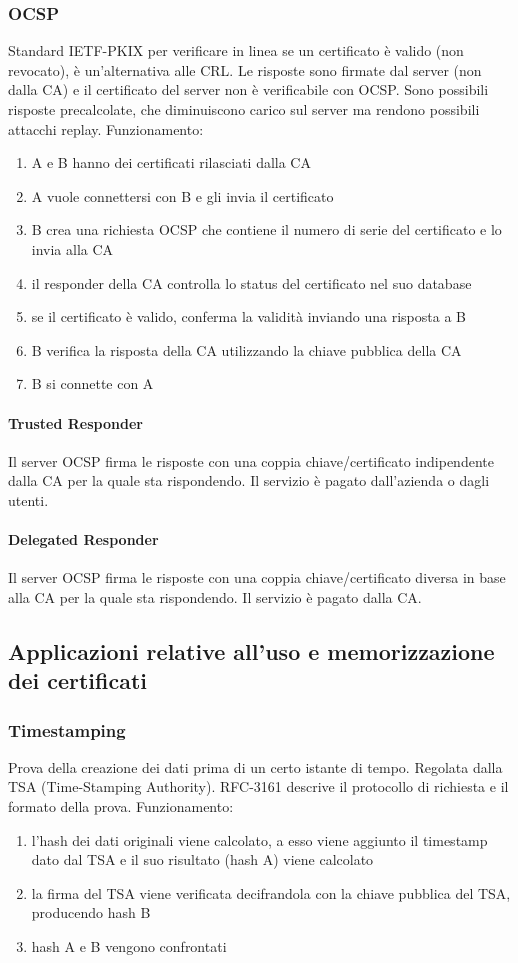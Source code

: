 \documentclass[11pt]{article}
\begin{document}
\subsubsection{OCSP}
Standard IETF-PKIX per verificare in linea se un certificato è valido (non revocato), è un'alternativa alle CRL. 
Le risposte sono firmate dal server (non dalla CA) e il certificato del server non è verificabile con OCSP.
Sono possibili risposte precalcolate, che diminuiscono carico sul server ma rendono possibili attacchi replay.
Funzionamento:
\begin{enumerate}
    \item A e B hanno dei certificati rilasciati dalla CA 
    \item A vuole connettersi con B e gli invia il certificato 
    \item B crea una richiesta OCSP che contiene il numero di serie del certificato e lo invia alla CA 
    \item il responder della CA controlla lo status del certificato nel suo database
    \item se il certificato è valido, conferma la validità inviando una risposta a B 
    \item B verifica la risposta della CA utilizzando la chiave pubblica della CA 
    \item B si connette con A 
\end{enumerate} 
\paragraph*{Trusted Responder}
Il server OCSP firma le risposte con una coppia chiave/certificato indipendente dalla CA per la quale sta rispondendo. Il 
servizio è pagato dall'azienda o dagli utenti.
\paragraph*{Delegated Responder} 
Il server OCSP firma le risposte con una coppia chiave/certificato diversa in base alla CA per la quale sta rispondendo. Il 
servizio è pagato dalla CA.
\subsection{Applicazioni relative all'uso e memorizzazione dei certificati}
\subsubsection{Timestamping}
Prova della creazione dei dati prima di un certo istante di tempo. Regolata dalla TSA (Time-Stamping Authority). RFC-3161
descrive il protocollo di richiesta e il formato della prova.
Funzionamento:
\begin{enumerate}
    \item l'hash dei dati originali viene calcolato, a esso viene aggiunto il timestamp dato dal TSA e il suo risultato 
    (hash A) viene calcolato
    \item la firma del TSA viene verificata decifrandola con la chiave pubblica del TSA, producendo hash B 
    \item hash A e B vengono confrontati 
\end{enumerate}
\end{document}
